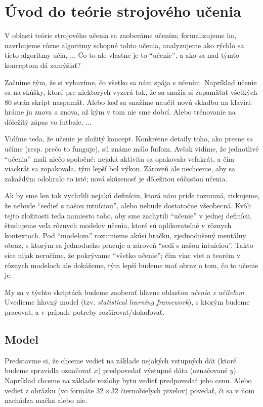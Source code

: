 \chapter{Úvod do teórie strojového učenia}

V oblasti teórie strojového učenia sa zaoberáme učením; formalizujeme ho,
navrhujeme rôzne algoritmy schopné tohto učenia, analyzujeme ako rýchlo
sa tieto algoritmy učia, ... Čo to ale vlastne je to ``učenie'', a ako sa
nad týmto konceptom dá zamýšľať?

Začnime tým, že si vybavíme, čo všetko sa nám spája s učením. Napríklad
učenie sa na skúšky, ktoré pre niektorých vyzerá tak, že sa snažia si
zapamätať všetkých $80$ strán skrípt naspamäť. Alebo keď sa snažíme
naučiť novú skladbu na klavíri: hráme ju znova a znova, až kým v tom
nie sme dobrí. Alebo trénovanie na dôležitý zápas vo futbale, ...

Vidíme teda, že učenie je zložitý koncept. Konkrétne detaily toho, ako
presne sa učíme (resp. prečo to funguje), sú známe málo ľuďom. Avšak
vidíme, že jednotlivé ``učenia'' mali niečo spoločné: nejaká aktivita
sa opakovala veľakrát, a čím viackrát sa zopakovala, tým lepší bol
výkon. Zároveň ale nechceme, aby sa zakaždým odohralo to isté; nová
skúsenosť je dôležitou súčasťou učenia.

Ak by sme len tak vychrlili nejakú definíciu, ktorá nám príde rozumná,
riskujeme, že nebude ``sedieť s našou intuíciou'', alebo nebude dostatočne
všeobecná. Kvôli tejto zložitosti teda namiesto toho, aby sme zachytili
``učenie'' v jednej definícii, študujeme veľa rôznych modelov učenia,
ktoré sú aplikovateľné v rôznych kontextoch. Pod ``modelom'' rozumieme
akúsi hračku, zjednodušený mentálny obraz, s ktorým sa jednoducho pracuje
a zároveň ``sedí s našou intuíciou''. Takto síce nijak neručíme, že pokrývame
``všetko učenie''; čím viac viet a teorém v rôznych modeloch ale dokážeme,
tým lepší budeme mať obraz o tom, čo to učenie je.

My sa v týchto skriptách budeme zaoberať hlavne oblasťou \emph{učenia s
učiteľom}. Uvedieme hlavný model (tzv. \emph{statistical learning framework}),
s ktorým budeme pracovať, a v prípade potreby rozširovať/dolaďovať.




\section{Model}

Predstavme si, že chceme vedieť na základe nejakých vstupných dát (ktoré
budeme spravidla označovať $x$) predpovedať výstupné dáta (označované $y$).
Napríklad chceme na základe rozlohy bytu vedieť predpovedať jeho cenu.
Alebo vedieť z obrázku (vo formáte $32 \times 32$ čiernobielych pixelov)
povedať, či sa v ňom nachádza mačka alebo nie.

